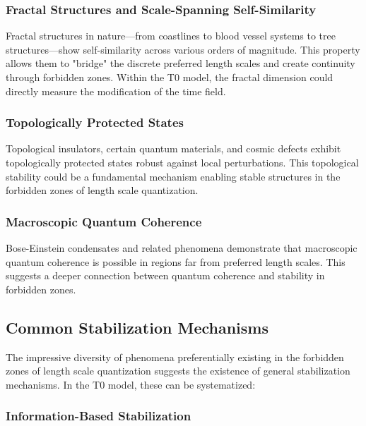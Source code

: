 \documentclass[12pt,a4paper]{article}
\begin{document}
	\subsubsection{Fractal Structures and Scale-Spanning Self-Similarity}
	\label{subsubsec:fraktale_strukturen}
	
	Fractal structures in nature—from coastlines to blood vessel systems to tree structures—show self-similarity across various orders of magnitude. This property allows them to "bridge" the discrete preferred length scales and create continuity through forbidden zones. Within the T0 model, the fractal dimension could directly measure the modification of the time field.
	
	\subsubsection{Topologically Protected States}
	\label{subsubsec:topologische_zustaende}
	
	Topological insulators, certain quantum materials, and cosmic defects exhibit topologically protected states robust against local perturbations. This topological stability could be a fundamental mechanism enabling stable structures in the forbidden zones of length scale quantization.
	
	\subsubsection{Macroscopic Quantum Coherence}
	\label{subsubsec:quantenkohaerenz}
	
	Bose-Einstein condensates and related phenomena demonstrate that macroscopic quantum coherence is possible in regions far from preferred length scales. This suggests a deeper connection between quantum coherence and stability in forbidden zones.
	
	\subsection{Common Stabilization Mechanisms}
	\label{subsec:stabilisierungsmechanismen}
	
	The impressive diversity of phenomena preferentially existing in the forbidden zones of length scale quantization suggests the existence of general stabilization mechanisms. In the T0 model, these can be systematized:
	
	\subsubsection{Information-Based Stabilization}
	\label{subsubsec:info_stabilisierung}
	
\end{document}
